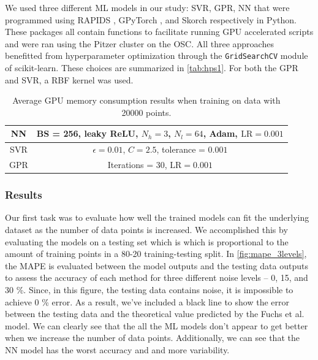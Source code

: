 We used three different \gls{ML} models in our study: \gls{SVR}, \gls{GPR}, \gls{NN} that were programmed using RAPIDS \cite{2023_RAPIDS}, GPyTorch \cite{Gardner_2018_GPytorch}, and Skorch \cite{Tietz_2017_Skorch} respectively in Python. These packages all contain functions to facilitate running \gls{GPU} accelerated scripts and were ran using the Pitzer cluster on the \gls{OSC}. All three approaches benefitted from hyperparameter optimization through the \texttt{GridSearchCV} module of scikit-learn. These choices are summarized in \autoref{tab:hps1}. For both the \gls{GPR} and \gls{SVR}, a \gls{RBF} kernel was used.

\begin{table}
	\centering
	\begin{tabular}{|c|c|}
			\hline
			NN & BS = 256, leaky ReLU, $N_h = 3$, $N_l = 64$, Adam, $\text{LR}=0.001$ \\
			\hline
			SVR & $\epsilon = 0.01$, $C = 2.5$, tolerance = $0.001$ \\
			\hline
			GPR & Iterations = 30, $\text{LR}=0.001$ \\
			\hline
	\end{tabular}
	\caption{Average GPU memory consumption results when training on data with 20000 points.}
	\label{tab:hps1}
\end{table}

\subsubsection{Results}

Our first task was to evaluate how well the trained models can fit the underlying dataset as the number of data points is increased. We accomplished this by evaluating the models on a testing set which is which is proportional to the amount of training points in a 80-20 training-testing split. In \autoref{fig:mape_3levels}, the \gls{MAPE} is evaluated between the model outputs and the testing data outputs to assess the accuracy of each method for three different noise levels -- 0, 15, and 30 \%. Since, in this figure, the testing data contains noise, it is impossible to achieve 0 \% error. As a result, we've included a black line to show the error between the testing data and the theoretical value predicted by the Fuchs et al. model. We can clearly see that the all the \gls{ML} models don't appear to get better when we increase the number of data points.  Additionally, we can see that the \gls{NN} model has the worst accuracy and and more variability.

